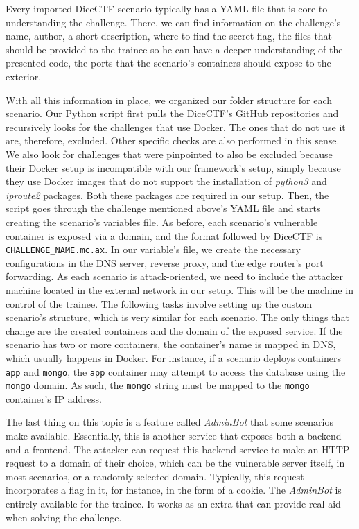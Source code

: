 Every imported DiceCTF scenario typically has a YAML file that is core to understanding the challenge. There, we can find information on the challenge's name, author, a short description, where to find the secret flag, the files that should be provided to the trainee so he can have a deeper understanding of the presented code, the ports that the scenario's containers should expose to the exterior.

With all this information in place, we organized our folder structure for each scenario. Our Python script first pulls the DiceCTF's GitHub repositories and recursively looks for the challenges that use Docker. The ones that do not use it are, therefore, excluded. Other specific checks are also performed in this sense. We also look for challenges that were pinpointed to also be excluded because their Docker setup is incompatible with our framework's setup, simply because they use Docker images that do not support the installation of \textit{python3} and \textit{iproute2} packages. Both these packages are required in our setup.
Then, the script goes through the challenge mentioned above's YAML file and starts creating the scenario's variables file. As before, each scenario's vulnerable container is exposed via a domain, and the format followed by DiceCTF is \texttt{{CHALLENGE\_NAME}.mc.ax}. In our variable's file, we create the necessary configurations in the DNS server, reverse proxy, and the edge router's port forwarding. As each scenario is attack-oriented, we need to include the attacker machine located in the external network in our setup. This will be the machine in control of the trainee. The following tasks involve setting up the custom scenario's structure, which is very similar for each scenario. The only things that change are the created containers and the domain of the exposed service. If the scenario has two or more containers, the container's name is mapped in DNS, which usually happens in Docker. For instance, if a scenario deploys containers \texttt{app} and \texttt{mongo}, the \texttt{app} container may attempt to access the database using the \texttt{mongo} domain. As such, the \texttt{mongo} string must be mapped to the \texttt{mongo} container's IP address.

The last thing on this topic is a feature called \textit{AdminBot} that some scenarios make available. Essentially, this is another service that exposes both a backend and a frontend. The attacker can request this backend service to make an HTTP request to a domain of their choice, which can be the vulnerable server itself, in most scenarios, or a randomly selected domain. Typically, this request incorporates a flag in it, for instance, in the form of a cookie. The \textit{AdminBot} is entirely available for the trainee. It works as an extra that can provide real aid when solving the challenge.


